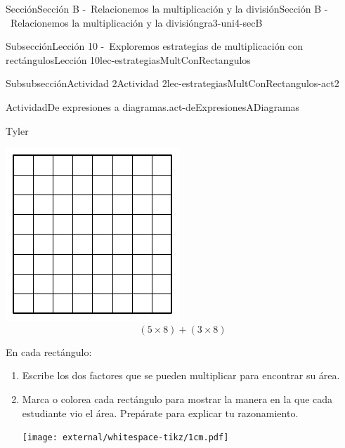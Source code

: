 \begin{sectionptx}{Sección}{Sección B -~Relacionemos la multiplicación y la división}{}{Sección B -~Relacionemos la multiplicación y la división}{}{}{gra3-uni4-secB}
\begin{subsectionptx}{Subsección}{Lección 10 -~Exploremos estrategias de multiplicación con rectángulos}{}{Lección 10}{}{}{lec-estrategiasMultConRectangulos}
\begin{subsubsectionptx}{Subsubsección}{Actividad 2}{}{Actividad 2}{}{}{lec-estrategiasMultConRectangulos-act2}
\begin{activity}{Actividad}{De expresiones a diagramas.}{act-deExpresionesADiagramas}
\begin{sidebyside}{3}{0.0166666666666667}{0.0166666666666667}{0.0333333333333333}
\begin{sbspanel}{0.3}
Tyler%
\par
\includegraphics[max width=\linewidth, center]{external/svg-source/tikz-file-153054.pdf}
%
\begin{equation*}
(5 \times 8) + (3 \times 8)
\end{equation*}
%
\end{sbspanel}%
\end{sidebyside}%
\par
En cada rectángulo:%
%
\begin{enumerate}
\item{}Escribe los dos factores que se pueden multiplicar para encontrar su área.%
\item{}Marca o colorea cada rectángulo para mostrar la manera en la que cada estudiante vio el área. Prepárate para explicar tu razonamiento.%
\begin{image}{0}{1}{0}{}%
\texttt{[image: external/whitespace-tikz/1cm.pdf]}
\end{image}%
\end{enumerate}
\end{activity}%
\end{subsubsectionptx}
%
%
\typeout{************************************************}
\typeout{************************************************}
%

\end{subsectionptx}
\end{sectionptx}
